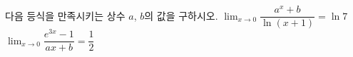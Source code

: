 다음 등식을 만족시키는 상수 $a$, $b$의 값을 구하시오.
 $\displaystyle\lim_{x\to 0}\dfrac{a^x+b}{\ln(x+1)}=\ln 7$ 
 $\displaystyle\lim_{x\to 0}\dfrac{e^{3x}-1}{ax+b}=\dfrac{1}{2}$
